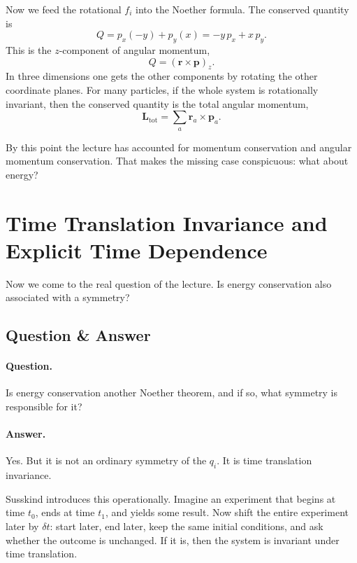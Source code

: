 Now we feed the rotational \(f_i\) into the Noether formula. The conserved quantity is
\begin{equation}
Q=p_x(-y)+p_y(x)=-y\,p_x+x\,p_y.
\end{equation}
This is the \(z\)-component of angular momentum,
\begin{equation}
Q=(\mathbf r\times \mathbf p)_z.
\end{equation}
In three dimensions one gets the other components by rotating the other coordinate planes. For many particles, if the whole system is rotationally invariant, then the conserved quantity is the total angular momentum,
\begin{equation}
\mathbf L_{\mathrm{tot}}=\sum_a \mathbf r_a\times \mathbf p_a.
\end{equation}

By this point the lecture has accounted for momentum conservation and angular momentum conservation. That makes the missing case conspicuous: what about energy?

\section{Time Translation Invariance and Explicit Time Dependence}

Now we come to the real question of the lecture. Is energy conservation also associated with a symmetry?

\subsection{Question \& Answer}

\paragraph{Question.} Is energy conservation another Noether theorem, and if so, what symmetry is responsible for it?

\paragraph{Answer.} Yes. But it is not an ordinary symmetry of the \(q_i\). It is time translation invariance.

Susskind introduces this operationally. Imagine an experiment that begins at time \(t_0\), ends at time \(t_1\), and yields some result. Now shift the entire experiment later by \(\delta t\): start later, end later, keep the same initial conditions, and ask whether the outcome is unchanged. If it is, then the system is invariant under time translation.

